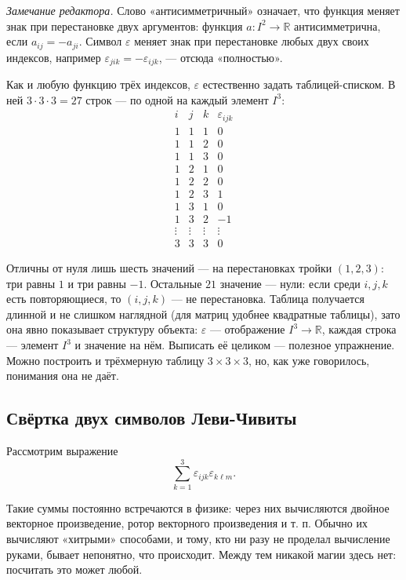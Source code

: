 \documentclass[11pt,a4paper]{article}
\begin{document}
\emph{Замечание редактора.} Слово «антисимметричный» означает, что функция меняет знак при перестановке двух аргументов: функция $a\colon I^2 \to \mathbb{R}$ антисимметрична, если $a_{ij} = -a_{ji}$. Символ $\varepsilon$ меняет знак при перестановке любых двух своих индексов, например $\varepsilon_{jik} = -\varepsilon_{ijk}$, — отсюда «полностью».

Как и любую функцию трёх индексов, $\varepsilon$ естественно задать таблицей-списком. В ней $3 \cdot 3 \cdot 3 = 27$ строк — по одной на каждый элемент $I^3$:
\[
\begin{array}{ccc|c}
i & j & k & \varepsilon_{ijk} \\ \hline
1 & 1 & 1 & 0 \\
1 & 1 & 2 & 0 \\
1 & 1 & 3 & 0 \\
1 & 2 & 1 & 0 \\
1 & 2 & 2 & 0 \\
1 & 2 & 3 & 1 \\
1 & 3 & 1 & 0 \\
1 & 3 & 2 & -1 \\
\vdots & \vdots & \vdots & \vdots \\
3 & 3 & 3 & 0
\end{array}
\]

Отличны от нуля лишь шесть значений — на перестановках тройки $(1, 2, 3)$: три равны $1$ и три равны $-1$. Остальные $21$ значение — нули: если среди $i, j, k$ есть повторяющиеся, то $(i, j, k)$ — не перестановка. Таблица получается длинной и не слишком наглядной (для матриц удобнее квадратные таблицы), зато она явно показывает структуру объекта: $\varepsilon$ — отображение $I^3 \to \mathbb{R}$, каждая строка — элемент $I^3$ и значение на нём. Выписать её целиком — полезное упражнение. Можно построить и трёхмерную таблицу $3 \times 3 \times 3$, но, как уже говорилось, понимания она не даёт.

\subsection{Свёртка двух символов Леви-Чивиты}

Рассмотрим выражение
\[
\sum_{k=1}^{3} \varepsilon_{ijk} \varepsilon_{k\ell m}.
\]

Такие суммы постоянно встречаются в физике: через них вычисляются двойное векторное произведение, ротор векторного произведения и т. п. Обычно их вычисляют «хитрыми» способами, и тому, кто ни разу не проделал вычисление руками, бывает непонятно, что происходит. Между тем никакой магии здесь нет: посчитать это может любой.
\end{document}
